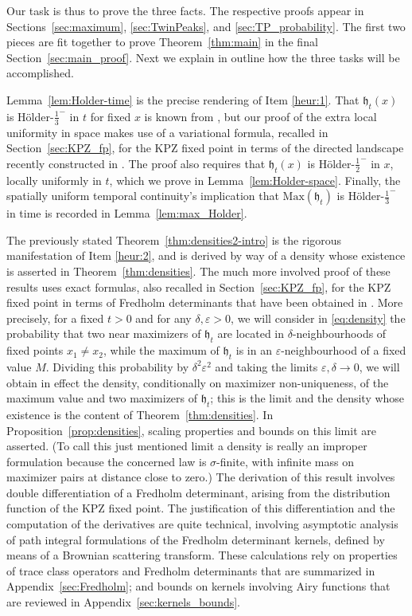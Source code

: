 \documentclass[oneside,final,11pt]{amsart}
\theoremstyle{definition}
\newcommand{\fh}{\mathfrak{h}}
\newcommand{\1}[1]{\mathbf{1}_{#1}}
\newcommand{\eps}{\varepsilon}
\newcommand{\km}[1]{\marginnote{\tiny{\color{red}[KM: #1]}}}
\newcommand{\Max}{\mathrm{Max}}
\numberwithin{equation}{section}
\begin{document}
Our task is thus to prove the three facts.  The respective proofs appear in Sections~\ref{sec:maximum}, \ref{sec:TwinPeaks}, and \ref{sec:TP_probability}. The first two pieces are fit together to prove Theorem~\ref{thm:main} in the final Section~\ref{sec:main_proof}. Next we explain in outline how the three tasks will be accomplished.

\smallskip
Lemma~\ref{lem:Holder-time} is the precise rendering of Item  \ref{heur:1}. That $\fh_t(x)$ is H\"older-$\frac{1}{3}^{\scriptscriptstyle-}$ in $t$ for fixed $x$ is known from \cite{fixedpt}, but our proof of the extra local uniformity in space makes use of a variational formula, recalled in Section~\ref{sec:KPZ_fp}, for the KPZ fixed point in terms of the directed landscape recently constructed in \cite{Landscape}. The proof also requires that $\fh_t(x)$ is H\"older-$\frac{1}{2}^{\scriptscriptstyle-}$ in $x$, locally uniformly in $t$, which we prove in Lemma~\ref{lem:Holder-space}. Finally, the spatially uniform temporal continuity's implication that $\Max(\fh_t)$ is H\"older-$\frac{1}{3}^{\scriptscriptstyle-}$ in time is recorded in Lemma~\ref{lem:max_Holder}.


\smallskip
The previously stated Theorem~\ref{thm:densities2-intro} is the rigorous manifestation of Item \ref{heur:2}, and is derived by way of a density whose existence is asserted in Theorem~\ref{thm:densities}. The much more involved proof of these results uses exact formulas,
also recalled in Section~\ref{sec:KPZ_fp}, for the KPZ fixed point in terms of Fredholm determinants that have been obtained in \cite{fixedpt}. More precisely, for a fixed $t > 0$ and for any $\delta, \eps > 0$, we will consider in \eqref{eq:density} the probability that two near maximizers of $\fh_t$ are located in $\delta$-neighbourhoods of fixed points $x_1 \neq x_2$, while the maximum of $\fh_t$ is in an $\eps$-neighbourhood of a fixed value $M$.
Dividing this probability by $\delta^2 \eps^2$ and taking the limits $\eps, \delta \to 0$, we will obtain in effect  the density, conditionally on maximizer non-uniqueness, of the maximum value and two maximizers of $\fh_t$; this is the limit and the density whose existence is the content of Theorem~\ref{thm:densities}. In Proposition~\ref{prop:densities}, scaling properties and bounds on this limit are asserted.
(To call this just mentioned limit a density is really an improper formulation because the concerned law is $\sigma$-finite, with infinite mass on maximizer pairs at distance close to zero.) The derivation of this result involves  double differentiation of a Fredholm determinant, arising from the distribution function of the KPZ fixed point. The justification of this differentiation and the computation of the derivatives are quite technical, involving asymptotic analysis of path integral formulations of the Fredholm determinant kernels, defined by means of  a Brownian scattering transform.
These calculations rely on properties of trace class operators and Fredholm determinants that are summarized in Appendix~\ref{sec:Fredholm}; and bounds on kernels involving Airy functions that are reviewed in Appendix~\ref{sec:kernels_bounds}.
\end{document}
